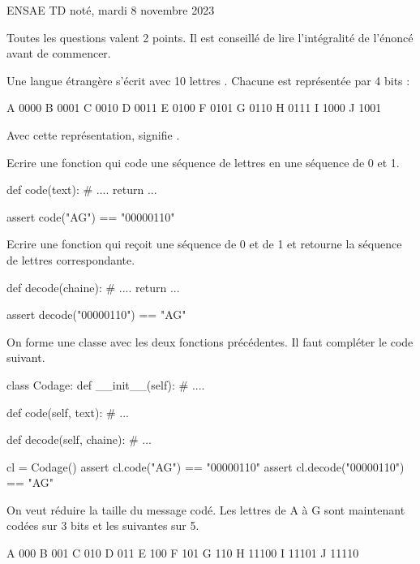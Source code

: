 %

\huge ENSAE TD noté, mardi 8 novembre 2023 \normalsize

Toutes les questions valent 2 points. Il est conseillé de lire l'intégralité de l'énoncé avant de commencer.

\exosubject{}
\begin{xexercice}\label{td_note_label4_2023}

Une langue étrangère s'écrit avec 10 lettres . Chacune est représentée par 4 bits :

\begin{verbatimx}
A 0000
B 0001
C 0010
D 0011
E 0100
F 0101
G 0110
H 0111
I 1000
J 1001
\end{verbatimx}

Avec cette représentation,  signifie .

\exequest Ecrire une fonction qui code une séquence de lettres en une séquence de 0 et 1.

\begin{verbatimx}
def code(text):
    # ....
    return ...

assert code("AG") == "00000110"
\end{verbatimx}

\exequest Ecrire une fonction qui reçoit une séquence de 0 et de 1 et retourne la séquence de lettres correspondante.

\begin{verbatimx}
def decode(chaine):
    # ....
    return ...

assert decode("00000110") == "AG"
\end{verbatimx}

\exequest On forme une classe avec les deux fonctions précédentes. Il faut compléter le code suivant.

\begin{verbatimx}
class Codage:
    def __init__(self):
        # ....

    def code(self, text):
        # ...

    def decode(self, chaine):
        # ...

cl = Codage()
assert cl.code("AG") == "00000110"
assert cl.decode("00000110") == "AG"
\end{verbatimx}

\exequest On veut réduire la taille du message codé.
Les lettres de A à G sont maintenant codées sur 3 bits et les suivantes sur 5.

\begin{verbatimx}
A 000
B 001
C 010
D 011
E 100
F 101
G 110
H 11100
I 11101
J 11110
\end{verbatimx}


\end{xexercice}
